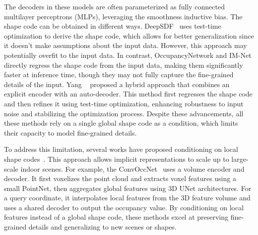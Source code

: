 The decoders in these models are often parameterized as fully connected multilayer perceptrons (MLPs), leveraging the smoothness inductive bias. The shape code can be obtained in different ways. DeepSDF~\cite{park2019deepsdf} uses test-time optimization to derive the shape code, which allows for better generalization since it doesn't make assumptions about the input data. However, this approach may potentially overfit to the input data. In contrast, OccupancyNetwork and IM-Net directly regress the shape code from the input data, making them significantly faster at inference time, though they may not fully capture the fine-grained details of the input. Yang \etal~\cite{yang2023reconstructing} proposed a hybrid approach that combines an explicit encoder with an auto-decoder. This method first regresses the shape code and then refines it using test-time optimization, enhancing robustness to input noise and stabilizing the optimization process. Despite these advancements, all these methods rely on a single global shape code as a condition, which limits their capacity to model fine-grained details.

To address this limitation, several works have proposed conditioning on local shape codes~\cite{peng2020convolutional, jiang2020local, genova2020local, chabra2020deep}. This approach allows implicit representations to scale up to large-scale indoor scenes. For example, the ConvOccNet~\cite{peng2020convolutional} uses a volume encoder and decoder. It first voxelizes the point cloud and extracts voxel features using a small PointNet, then aggregates global features using 3D UNet architectures. For a query coordinate, it interpolates local features from the 3D feature volume and uses a shared decoder to output the occupancy value. By conditioning on local features instead of a global shape code, these methods excel at preserving fine-grained details and generalizing to new scenes or shapes.

